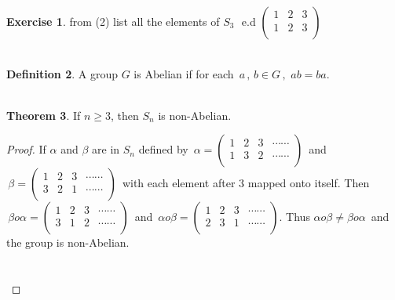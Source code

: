 \documentclass[11pt,a4paper]{article}
\theoremstyle{definition}
\newtheorem{thm}{Theorem}[subsection]
\newtheorem{defn}[thm]{Definition}
\newtheorem{exe}[thm]{Exercise}
\begin{document}
\begin{exe}
from (2) list all the elements of $S_3\,\, $ e.d $\begin{pmatrix}
1 & 2 & 3\\
1 & 2 & 3\\
\end{pmatrix}$\\\\
\end{exe}








\begin{defn}
A group $G$ is Abelian if for each $\, a\, , \, b\in G\, , \, \, ab = ba$.\\\\
\end{defn}




\begin{thm}
If $n\geq 3$, then $S_n$ is non-Abelian.\\
\end{thm}

\begin{proof}
If $\alpha$ and $\beta$ are in $S_n$ defined by $\, \alpha = \begin{pmatrix}
1 & 2  & 3 & \cdots\cdots\\
1 & 3  & 2 & \cdots\cdots\\
\end{pmatrix}\,$ and $\, \beta = \begin{pmatrix}
1 & 2 & 3 & \cdots\cdots\\
3 & 2 & 1 & \cdots\cdots\\
\end{pmatrix}\,$ with each element after 3 mapped onto itself. Then $\, \beta o\alpha = \begin{pmatrix}
1 & 2 & 3 & \cdots\cdots\\
3 & 1 & 2 & \cdots\cdots\\
\end{pmatrix}\,$ and $\, \alpha o\beta = \begin{pmatrix}
1 & 2 & 3 & \cdots\cdots\\
2 & 3 & 1 & \cdots\cdots\\
\end{pmatrix}$. Thus $\alpha o\beta \neq \beta o\alpha\, $ and the group is non-Abelian.\\\\\\
\end{proof}
\end{document}
